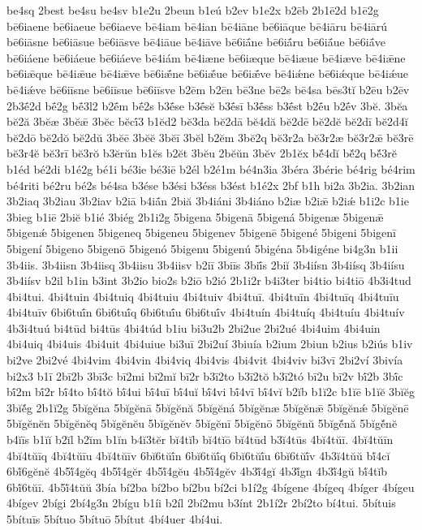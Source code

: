 {be4sq
2best
be4su
be4sv
b1e2u
2beun
b1eú
b2ev
b1e2x
b2ēb
2b1ē2d
b1ē2g
bē6iaene
bē6iaeue
bē6iaeve
bē4iam
bē4ian
bē4iāne
bē6iāque
bē4iāru
bē4iārú
bē6iāsne
bē6iāsue
bē6iāsve
bē4iāue
bē4iāve
bē6iā́ne
bē6iā́ru
bē6iā́ue
bē6iā́ve
bē6iáene
bē6iáeue
bē6iáeve
bē4iám
bē4iæne
bē6iæque
bē4iæue
bē4iæve
bē4iǣne
bē6iǣque
bē4iǣue
bē4iǣve
bē6iǣ́ne
bē6iǣ́ue
bē6iǣ́ve
bē4iǽne
bē6iǽque
bē4iǽue
bē4iǽve
bē6iīsne
bē6iīsue
bē6iīsve
b2ēm
b2ēn
bē3ne
bē2s
bē4sa
bēs3tĭ
b2ēu
b2ēv
2b3ḗ2d
bḗ2g
bḗ3l2
b2ḗm
bḗ2s
b3ḗse
b3ḗsĕ
b3ḗsī
b3ḗss
b3ḗst
b2ḗu
b2ḗv
3bĕ.
3bĕa
bĕ2ă
3bĕæ
3bĕǣ
3bĕc
bĕcī́3
b1ĕd2
bĕ3da
bĕ2dā
bĕ4dă
bĕ2dē
bĕ2dĕ
bĕ2dī
bĕ2d4ĭ
bĕ2dō
bĕ2dŏ
bĕ2dŭ
3bĕē
3bĕĕ
3bĕī
3bĕl
b2ĕm
3bĕ2q
bĕ3r2a
bĕ3r2æ
bĕ3r2ǣ
bĕ3rē
bĕ3r4ĕ
bĕ3rī
bĕ3rŏ
b3ĕrŭn
b1ĕs
b2ĕt
3bĕu
2bĕŭn
3bĕv
2b1ĕx
bĕ́4dĭ
bĕ́2q
bĕ́3rĕ
b1éd
bé2di
b1é2g
bé1i
bé3ie
bé3iē
b2él
b2é1m
bé4n3ia
3béra
3bérie
bé4rig
bé4rim
bé4riti
bé2ru
bé2s
bé4sa
b3ése
b3ési
b3éss
b3ést
b1é2x
2bf
b1h
bi2a
3b2ia.
3b2ian
3b2iaq
3b2iau
3b2iav
b2iā
b4iā́n
2biă
3b4iáni
3b4iáno
b2iæ
b2iǣ
b2iǽ
b1i2c
b1ie
3bieg
b1iē
2biĕ
b1ié
3biég
2b1i2g
5bigena
5bigenā
5bigená
5bigenæ
5bigenǣ
5bigenǽ
5bigenen
5bigeneq
5bigeneu
5bigenev
5bigenē
5bigené
5bigeni
5bigenī
5bigení
5bigeno
5bigenō
5bigenó
5bigenu
5bigenú
5bigéna
5b4igéne
bi4g3n
b1ii
3b4iis.
3b4iisn
3b4iisq
3b4iisu
3b4iisv
b2iī
3biīs
3biī́s
2biĭ
3b4iísn
3b4iísq
3b4iísu
3b4iísv
b2il
b1in
b3int
3b2io
bio2s
b2iō
b2ió
2b1i2r
b4i3ter
bi4tio
bi4tiō
4b3i4tud
4bi4tui.
4bi4tuin
4bi4tuiq
4bi4tuiu
4bi4tuiv
4bi4tuī.
4bi4tuīn
4bi4tuīq
4bi4tuīu
4bi4tuīv
6bi6tuī́n
6bi6tuī́q
6bi6tuī́u
6bi6tuī́v
4bi4tuín
4bi4tuíq
4bi4tuíu
4bi4tuív
4b3i4tuú
bi4tūd
bi4tūs
4bi4túd
b1iu
bi3u2b
2bi2ue
2bi2ué
4bi4uim
4bi4uin
4bi4uiq
4bi4uis
4bi4uit
4bi4uiue
bi3uī
2bi2uí
3biuía
b2ium
2biun
b2ius
b2iús
b1iv
bi2ve
2bi2vé
4bi4vim
4bi4vin
4bi4viq
4bi4vis
4bi4vit
4bi4viv
bi3vī
2bi2ví
3bivía
bi2x3
b1ī
2bī2b
3bī3c
bī2mi
bī2mĭ
bī2r
b3ī2to
b3ī2tŏ
b3ī2tó
bī2u
bī2v
bī́2b
3bī́c
bī́2m
bī́2r
bī́4to
bī́4tŏ
bī́4ui
bī́4uī
bī́4uĭ
bī́4vi
bī́4vī
bī́4vĭ
b2ĭb
b1ĭ2c
b1ĭē
b1ĭĕ
3bĭĕg
3bĭĕ́g
2b1ĭ2g
5bĭgĕna
5bĭgĕnā
5bĭgĕnă
5bĭgĕná
5bĭgĕnæ
5bĭgĕnǣ
5bĭgĕnǽ
5bĭgĕnē
5bĭgĕnĕn
5bĭgĕnĕq
5bĭgĕnĕu
5bĭgĕnĕv
5bĭgĕnī
5bĭgĕnō
5bĭgĕnŭ
5bĭgĕ́nă
5bĭgĕ́nĕ
b4ĭīs
b1ĭĭ
b2ĭl
b2ĭm
b1ĭn
b4ĭ3tĕr
bĭ4tĭb
bĭ4tĭō
bĭ4tūd
b3ĭ4tūs
4bĭ4tŭī.
4bĭ4tŭīn
4bĭ4tŭīq
4bĭ4tŭīu
4bĭ4tŭīv
6bĭ6tŭī́n
6bĭ6tŭī́q
6bĭ6tŭī́u
6bĭ6tŭī́v
4b3ĭ4tŭŭ
bĭ́4cĭ
6bĭ́6gĕnĕ
4b5ĭ́4gĕq
4b5ĭ́4gĕr
4b5ĭ́4gĕu
4b5ĭ́4gĕv
4b3ĭ́4gĭ
4b3ĭ́gn
4b3ĭ́4gŭ
bĭ́4tĭb
6bĭ́6tŭī.
4b5ĭ́4tŭŭ
3bía
bí2ba
bí2bo
bí2bu
bí2ci
b1í2g
4bígene
4bígeq
4bíger
4bígeu
4bígev
2bígi
2bí4g3n
2bígu
b1íi
b2íl
2bí2mu
b3ínt
2b1í2r
2bí2to
bí4tui.
5bítuis
5bítuīs
5bítuo
5bítuō
5bítut
4bí4uer
4bí4ui.
}
